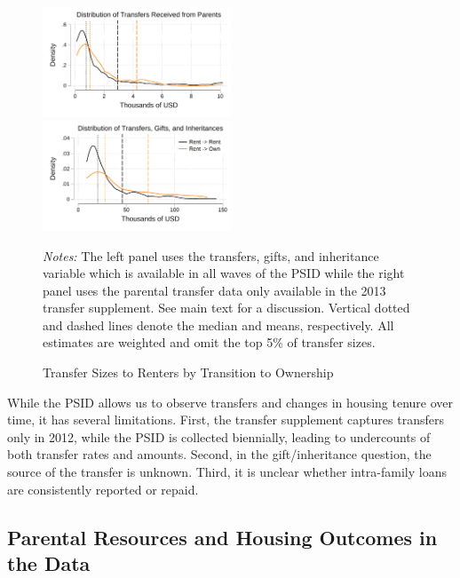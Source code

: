 \documentclass[12pt]{article}
\begin{document}
\begin{figure}[tb]
	\caption{Transfer Sizes to Renters by Transition to Ownership}\label{fig:PSID_transfer_to_renters}
	\includegraphics[width=0.5\textwidth]{../tabfig/descr/PSID_transfers_renters_transfers.pdf}%
	\includegraphics[width=0.5\textwidth]{../tabfig/descr/PSID_transfers_renters_inheritance.pdf}%
	
	 {\begin{footnotesize} \textit{Notes:} The left panel uses the transfers, gifts, and inheritance variable which is available in all waves of the PSID while the right panel uses the parental transfer data only available in the 2013 transfer supplement. See main text for a discussion. Vertical dotted and dashed lines denote the median and means, respectively. All estimates are weighted and omit the top 5\% of transfer sizes. \end{footnotesize}}
\end{figure}

While the PSID allows us to observe transfers and changes in housing tenure over time, it has several limitations. First, the transfer supplement captures transfers only in 2012, while the PSID is collected biennially, leading to undercounts of both transfer rates and amounts. Second, in the gift/inheritance question, the source of the transfer is unknown. Third, it is unclear whether intra-family loans are consistently reported or repaid.

\subsection{Parental Resources and Housing Outcomes in the Data}\label{sec:dataregr}
\end{document}
